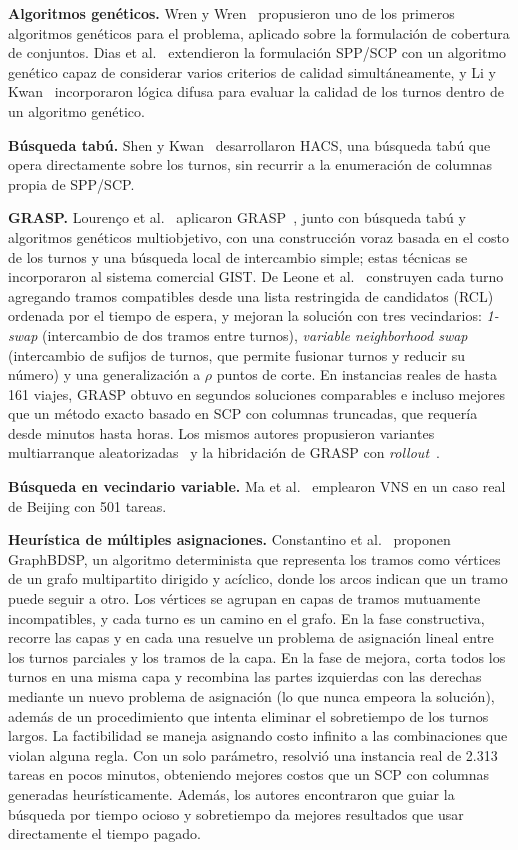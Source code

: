 \documentclass[letter, 10pt]{article}
\begin{document}
\textbf{Algoritmos genéticos.} Wren y Wren~\cite{WrenWren1995} propusieron uno de los primeros algoritmos genéticos para el problema, aplicado sobre la formulación de cobertura de conjuntos. Dias et al.~\cite{Dias2002} extendieron la formulación SPP/SCP con un algoritmo genético capaz de considerar varios criterios de calidad simultáneamente, y Li y Kwan~\cite{LiKwan2003} incorporaron lógica difusa para evaluar la calidad de los turnos dentro de un algoritmo genético.

\textbf{Búsqueda tabú.} Shen y Kwan~\cite{ShenKwan2001} desarrollaron HACS, una búsqueda tabú que opera directamente sobre los turnos, sin recurrir a la enumeración de columnas propia de SPP/SCP.

\textbf{GRASP.} Lourenço et al.~\cite{Lourenco2001} aplicaron GRASP~\cite{FeoResende1995}, junto con búsqueda tabú y algoritmos genéticos multiobjetivo, con una construcción voraz basada en el costo de los turnos y una búsqueda local de intercambio simple; estas técnicas se incorporaron al sistema comercial GIST. De Leone et al.~\cite{DeLeone2011a} construyen cada turno agregando tramos compatibles desde una lista restringida de candidatos (RCL) ordenada por el tiempo de espera, y mejoran la solución con tres vecindarios: \emph{1-swap} (intercambio de dos tramos entre turnos), \emph{variable neighborhood swap} (intercambio de sufijos de turnos, que permite fusionar turnos y reducir su número) y una generalización a $\rho$ puntos de corte. En instancias reales de hasta 161 viajes, GRASP obtuvo en segundos soluciones comparables e incluso mejores que un método exacto basado en SCP con columnas truncadas, que requería desde minutos hasta horas. Los mismos autores propusieron variantes multiarranque aleatorizadas~\cite{DeLeone2011b} y la hibridación de GRASP con \emph{rollout}~\cite{DAnnibale2007}.

\textbf{Búsqueda en vecindario variable.} Ma et al.~\cite{Ma2016} emplearon VNS en un caso real de Beijing con 501 tareas.

\textbf{Heurística de múltiples asignaciones.} Constantino et al.~\cite{Constantino2017} proponen GraphBDSP, un algoritmo determinista que representa los tramos como vértices de un grafo multipartito dirigido y acíclico, donde los arcos indican que un tramo puede seguir a otro. Los vértices se agrupan en capas de tramos mutuamente incompatibles, y cada turno es un camino en el grafo. En la fase constructiva, recorre las capas y en cada una resuelve un problema de asignación lineal entre los turnos parciales y los tramos de la capa. En la fase de mejora, corta todos los turnos en una misma capa y recombina las partes izquierdas con las derechas mediante un nuevo problema de asignación (lo que nunca empeora la solución), además de un procedimiento que intenta eliminar el sobretiempo de los turnos largos. La factibilidad se maneja asignando costo infinito a las combinaciones que violan alguna regla. Con un solo parámetro, resolvió una instancia real de 2.313 tareas en pocos minutos, obteniendo mejores costos que un SCP con columnas generadas heurísticamente. Además, los autores encontraron que guiar la búsqueda por tiempo ocioso y sobretiempo da mejores resultados que usar directamente el tiempo pagado.
\end{document}
